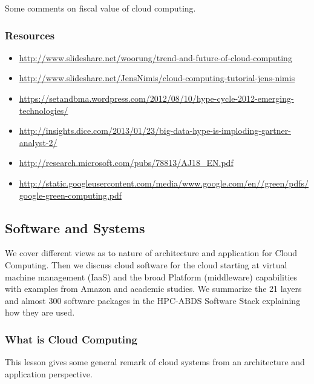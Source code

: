 Some comments on fiscal value of cloud computing.



\subsubsection{Resources}\label{resources-1}

\begin{itemize}
\item
  \url{http://www.slideshare.net/woorung/trend-and-future-of-cloud-computing}
\item
  \url{http://www.slideshare.net/JensNimis/cloud-computing-tutorial-jens-nimis}
\item
  \url{https://setandbma.wordpress.com/2012/08/10/hype-cycle-2012-emerging-technologies/}
\item
  \url{http://insights.dice.com/2013/01/23/big-data-hype-is-imploding-gartner-analyst-2/}
\item
  \url{http://research.microsoft.com/pubs/78813/AJ18_EN.pdf}
\item
  \url{http://static.googleusercontent.com/media/www.google.com/en//green/pdfs/google-green-computing.pdf}
\end{itemize}

\subsection{Software and Systems}

We cover different views as to nature of architecture and application
for Cloud Computing. Then we discuss cloud software for the cloud
starting at virtual machine management (IaaS) and the broad Platform
(middleware) capabilities with examples from Amazon and academic
studies. We summarize the 21 layers and almost 300 software packages in
the HPC-ABDS Software Stack explaining how they are used.



\subsubsection{What is Cloud Computing}\label{what-is-cloud-computing}

This lesson gives some general remark of cloud systems from an
architecture and application perspective.

